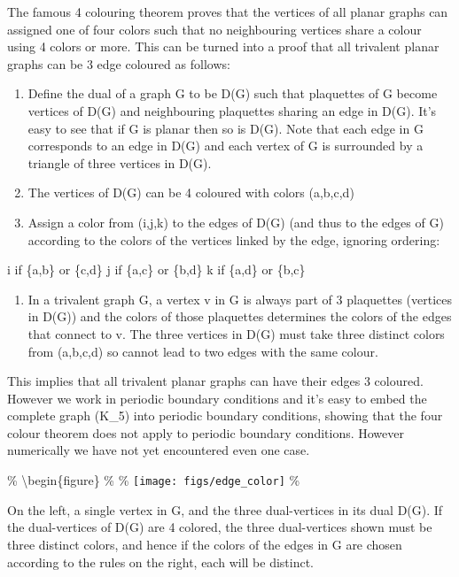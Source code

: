 The famous 4 colouring theorem proves that the vertices of all planar
graphs can assigned one of four colors such that no neighbouring
vertices share a colour using 4 colors or more. This can be turned into
a proof that all trivalent planar graphs can be 3 edge coloured as
follows:

\begin{enumerate}
\def\labelenumi{\arabic{enumi})}
\item
  Define the dual of a graph G to be D(G) such that plaquettes of G
  become vertices of D(G) and neighbouring plaquettes sharing an edge in
  D(G). It's easy to see that if G is planar then so is D(G). Note that
  each edge in G corresponds to an edge in D(G) and each vertex of G is
  surrounded by a triangle of three vertices in D(G).
\item
  The vertices of D(G) can be 4 coloured with colors (a,b,c,d)
\item
  Assign a color from (i,j,k) to the edges of D(G) (and thus to the
  edges of G) according to the colors of the vertices linked by the
  edge, ignoring ordering:
\end{enumerate}

i if \{a,b\} or \{c,d\} j if \{a,c\} or \{b,d\} k if \{a,d\} or \{b,c\}

\begin{enumerate}
\def\labelenumi{\arabic{enumi})}
\setcounter{enumi}{3}
\tightlist
\item
  In a trivalent graph G, a vertex v in G is always part of 3 plaquettes
  (vertices in D(G)) and the colors of those plaquettes determines the
  colors of the edges that connect to v. The three vertices in D(G) must
  take three distinct colors from (a,b,c,d) so cannot lead to two edges
  with the same colour.
\end{enumerate}

This implies that all trivalent planar graphs can have their edges 3
coloured. However we work in periodic boundary conditions and it's easy
to embed the complete graph (K\_5) into periodic boundary conditions,
showing that the four colour theorem does not apply to periodic boundary
conditions. However numerically we have not yet encountered even one
case.

\% \textbackslash begin\{figure\} \% \centering \%
\texttt{[image: figs/edge\_color]} \%

\caption{On the left, a single vertex in G, and the three dual-vertices in its dual D(G). If the dual-vertices of D(G) are 4 colored, the three dual-vertices shown must be three distinct colors, and hence if the colors of the edges in G are chosen according to the rules on the right, each will be distinct.}

